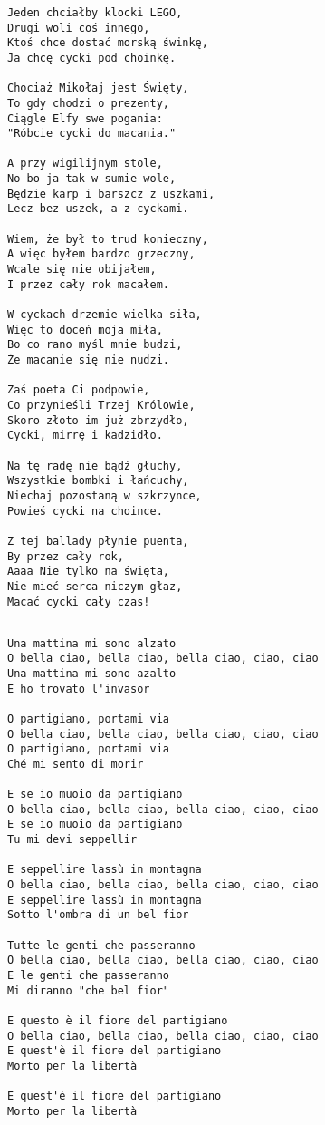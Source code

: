 \documentclass[12pt]{article}
\begin{document}
\subsubsection*{}
\begin{verbatim}
Jeden chciałby klocki LEGO,
Drugi woli coś innego,
Ktoś chce dostać morską świnkę,
Ja chcę cycki pod choinkę.

Chociaż Mikołaj jest Święty,
To gdy chodzi o prezenty,
Ciągle Elfy swe pogania:
"Róbcie cycki do macania."

A przy wigilijnym stole,
No bo ja tak w sumie wole,
Będzie karp i barszcz z uszkami,
Lecz bez uszek, a z cyckami.

Wiem, że był to trud konieczny,
A więc byłem bardzo grzeczny,
Wcale się nie obijałem,
I przez cały rok macałem.

W cyckach drzemie wielka siła,
Więc to doceń moja miła,
Bo co rano myśl mnie budzi,
Że macanie się nie nudzi.

Zaś poeta Ci podpowie,
Co przynieśli Trzej Królowie,
Skoro złoto im już zbrzydło,
Cycki, mirrę i kadzidło.

Na tę radę nie bądź głuchy,
Wszystkie bombki i łańcuchy,
Niechaj pozostaną w szkrzynce,
Powieś cycki na choince.

Z tej ballady płynie puenta,
By przez cały rok,
Aaaa Nie tylko na święta,
Nie mieć serca niczym głaz,
Macać cycki cały czas!
\end{verbatim}
\clearpage

\subsection*{}
\begin{verbatim}
Una mattina mi sono alzato
O bella ciao, bella ciao, bella ciao, ciao, ciao
Una mattina mi sono azalto
E ho trovato l'invasor

O partigiano, portami via
O bella ciao, bella ciao, bella ciao, ciao, ciao
O partigiano, portami via
Ché mi sento di morir

E se io muoio da partigiano
O bella ciao, bella ciao, bella ciao, ciao, ciao
E se io muoio da partigiano
Tu mi devi seppellir

E seppellire lassù in montagna
O bella ciao, bella ciao, bella ciao, ciao, ciao
E seppellire lassù in montagna
Sotto l'ombra di un bel fior

Tutte le genti che passeranno
O bella ciao, bella ciao, bella ciao, ciao, ciao
E le genti che passeranno
Mi diranno "che bel fior"

E questo è il fiore del partigiano
O bella ciao, bella ciao, bella ciao, ciao, ciao
E quest'è il fiore del partigiano
Morto per la libertà

E quest'è il fiore del partigiano
Morto per la libertà
\end{verbatim}
\clearpage
\end{document}
